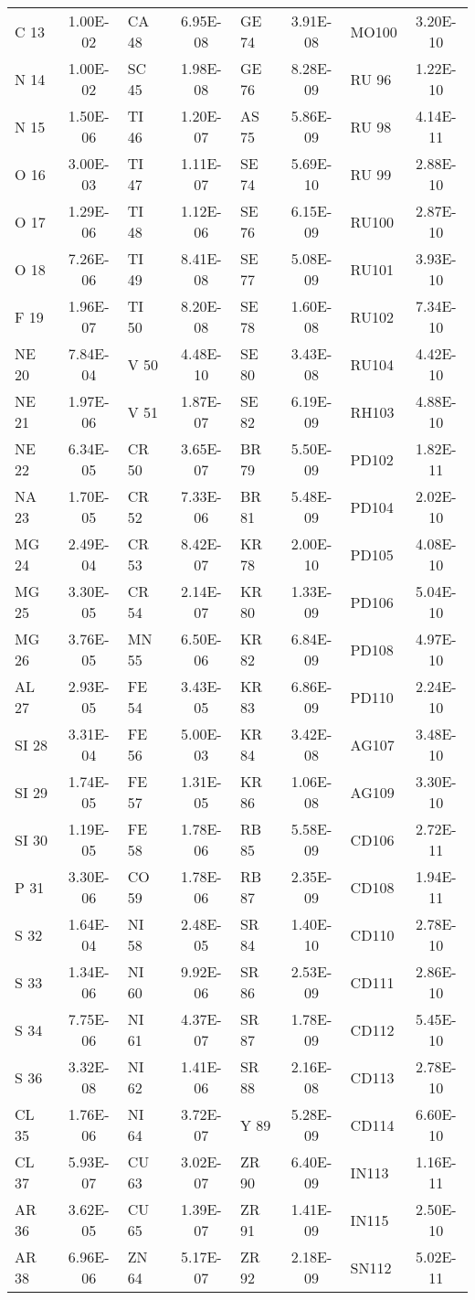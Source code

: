 \begin{table}[!tp]
\begin{minipage}{\textwidth}
{\begin{tabular}{lc|lc|lc|lc}
C  13&1.00E-02&CA 48&6.95E-08&GE 74&3.91E-08&MO100&3.20E-10\\
N  14&1.00E-02&SC 45&1.98E-08&GE 76&8.28E-09&RU 96&1.22E-10\\
N  15&1.50E-06&TI 46&1.20E-07&AS 75&5.86E-09&RU 98&4.14E-11\\
O  16&3.00E-03&TI 47&1.11E-07&SE 74&5.69E-10&RU 99&2.88E-10\\
O  17&1.29E-06&TI 48&1.12E-06&SE 76&6.15E-09&RU100&2.87E-10\\
O  18&7.26E-06&TI 49&8.41E-08&SE 77&5.08E-09&RU101&3.93E-10\\
F  19&1.96E-07&TI 50&8.20E-08&SE 78&1.60E-08&RU102&7.34E-10\\
NE 20&7.84E-04&V  50&4.48E-10&SE 80&3.43E-08&RU104&4.42E-10\\
NE 21&1.97E-06&V  51&1.87E-07&SE 82&6.19E-09&RH103&4.88E-10\\
NE 22&6.34E-05&CR 50&3.65E-07&BR 79&5.50E-09&PD102&1.82E-11\\
NA 23&1.70E-05&CR 52&7.33E-06&BR 81&5.48E-09&PD104&2.02E-10\\
MG 24&2.49E-04&CR 53&8.42E-07&KR 78&2.00E-10&PD105&4.08E-10\\
MG 25&3.30E-05&CR 54&2.14E-07&KR 80&1.33E-09&PD106&5.04E-10\\
MG 26&3.76E-05&MN 55&6.50E-06&KR 82&6.84E-09&PD108&4.97E-10\\
AL 27&2.93E-05&FE 54&3.43E-05&KR 83&6.86E-09&PD110&2.24E-10\\
SI 28&3.31E-04&FE 56&5.00E-03&KR 84&3.42E-08&AG107&3.48E-10\\
SI 29&1.74E-05&FE 57&1.31E-05&KR 86&1.06E-08&AG109&3.30E-10\\
SI 30&1.19E-05&FE 58&1.78E-06&RB 85&5.58E-09&CD106&2.72E-11\\
P  31&3.30E-06&CO 59&1.78E-06&RB 87&2.35E-09&CD108&1.94E-11\\
S  32&1.64E-04&NI 58&2.48E-05&SR 84&1.40E-10&CD110&2.78E-10\\
S  33&1.34E-06&NI 60&9.92E-06&SR 86&2.53E-09&CD111&2.86E-10\\
S  34&7.75E-06&NI 61&4.37E-07&SR 87&1.78E-09&CD112&5.45E-10\\
S  36&3.32E-08&NI 62&1.41E-06&SR 88&2.16E-08&CD113&2.78E-10\\
CL 35&1.76E-06&NI 64&3.72E-07&Y  89&5.28E-09&CD114&6.60E-10\\
CL 37&5.93E-07&CU 63&3.02E-07&ZR 90&6.40E-09&IN113&1.16E-11\\
AR 36&3.62E-05&CU 65&1.39E-07&ZR 91&1.41E-09&IN115&2.50E-10\\
AR 38&6.96E-06&ZN 64&5.17E-07&ZR 92&2.18E-09&SN112&5.02E-11\\
\end{tabular}%
}
\vspace{-0.2cm}
\end{minipage}
\end{table}
\endgroup


